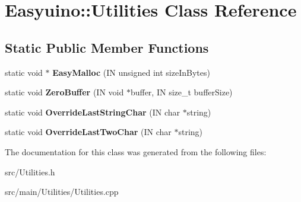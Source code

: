 \hypertarget{class_easyuino_1_1_utilities}{}\section{Easyuino\+:\+:Utilities Class Reference}
\label{class_easyuino_1_1_utilities}
\subsection*{Static Public Member Functions}
\begin{DoxyCompactItemize}
\item 
\mbox{\label{class_easyuino_1_1_utilities_a8b1524a6948b18824682be376ef6a101}} 
static void $\ast$ {\bfseries Easy\+Malloc} (IN unsigned int size\+In\+Bytes)
\item 
\mbox{\label{class_easyuino_1_1_utilities_a381bc8fc1042cf05f22736cd6f7c893f}} 
static void {\bfseries Zero\+Buffer} (IN void $\ast$buffer, IN size\+\_\+t buffer\+Size)
\item 
\mbox{\label{class_easyuino_1_1_utilities_a06b658799fb8531572f06607df689a61}} 
static void {\bfseries Override\+Last\+String\+Char} (IN char $\ast$string)
\item 
\mbox{\label{class_easyuino_1_1_utilities_a060ef2f66a618a11a249362baa7cb22d}} 
static void {\bfseries Override\+Last\+Two\+Char} (IN char $\ast$string)
\end{DoxyCompactItemize}


The documentation for this class was generated from the following files\+:\begin{DoxyCompactItemize}
\item 
src/Utilities.\+h\item 
src/main/\+Utilities/Utilities.\+cpp\end{DoxyCompactItemize}
